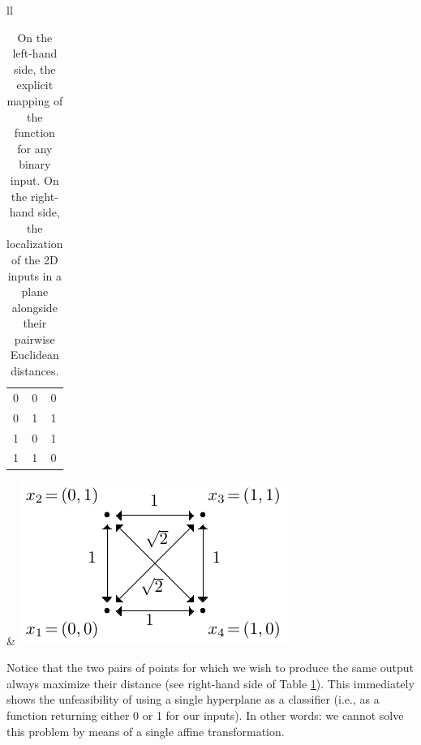 \documentclass[12pt]{report} %
\newcommand{\tmverbatim}[1]{\text{{\ttfamily{#1}}}}
\begin{document}
\begin{table}[h]
  \begin{tabular}{ll}
    \frame
    {\begin{tabular}{|c|c|c|}
      \hline
      \tmverbatim{A} & \tmverbatim{B} & \tmverbatim{xor(A,B)}\\
      \hline
      0 & 0 & 0\\
      \hline
      0 & 1 & 1\\
      \hline
      1 & 0 & 1\\
      \hline
      1 & 1 & 0\\
      \hline
    \end{tabular}} &
    {\includegraphics[width=.41\textwidth]{imagenes/rbf_discussion/drawing-xor.pdf}}
  \end{tabular}
  \caption{On the left-hand side, the explicit mapping of the \tmverbatim{xor}
  function for any binary input. On the right-hand side, the localization of
  the 2D inputs in a plane alongside their pairwise Euclidean distances.
  }
  \label{table-xor-distances}
\end{table}

Notice that the two pairs of points for which we wish to produce the same
output always maximize their distance (see right-hand side of Table
\ref{table-xor-distances}). This immediately shows the unfeasibility of using
a single hyperplane as a classifier (i.e., as a function returning either 0 or
1 for our inputs). In other words: we cannot solve this problem by means of a
single affine transformation.
\end{document}
